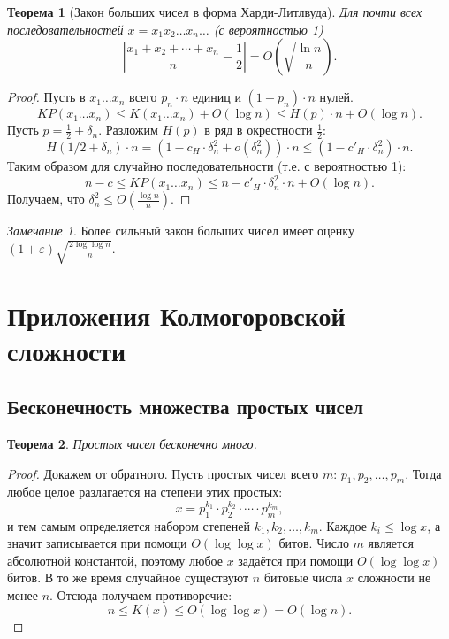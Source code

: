 \documentclass[12pt]{article}
\newcommand{\seqn}[2]{{#1}_1,{#1}_2,\dotsc,{#1}_{#2}}
\theoremstyle{definition}
\theoremstyle{plain}
\newtheorem{theorem}{Теорема}[section]
\theoremstyle{remark}
\newtheorem{remark}{Замечание}[section]
\begin{document}
\begin{theorem}[Закон больших чисел в форма Харди-Литлвуда]
    Для почти всех последовательностей $\bar x = x_1x_2\dotso x_n\dotso$ (с
    вероятностью 1)
    \[
        \left|\frac{x_1+x_2+\dotsb+x_n}{n} - \frac12\right| = 
        O\left(\sqrt{\frac{\ln n}{n}}\right).
    \]
\end{theorem}
\begin{proof}
    Пусть в $x_1\dotso x_n$ всего $p_n\cdot n$ единиц и $(1-p_n)\cdot n$ нулей. 
    \[
        KP(x_1\dotso x_n)\le K(x_1\dotso x_n) + O(\log n) \le 
        H(p)\cdot n + O(\log n).
    \]
    Пусть $p=\frac12 + \delta_n$. Разложим $H(p)$ в ряд в окрестности $\frac12$:
    \[
        H(1/2 + \delta_n)\cdot n = (1 - c_H\cdot\delta_n^2 + o(\delta_n^2))\cdot n
        \le(1 - c'_H\cdot\delta_n^2)\cdot n.
    \]
    Таким образом для случайно последовательности (т.е. с вероятностью 1):
    \[
        n - c \le KP(x_1\dotso x_n)\le n - c'_H\cdot\delta_n^2\cdot n + O(\log n).
    \]
    Получаем, что $\delta_n^2\le O\left(\frac{\log n}{n}\right)$.
\end{proof}
\begin{remark}
    Более сильный закон больших чисел имеет оценку
    $(1+\varepsilon)\sqrt{\frac{2\log\log n}{n}}$.
\end{remark}

\section{Приложения Колмогоровской сложности}

\subsection{Бесконечность множества простых чисел}
\begin{theorem}
    Простых чисел бесконечно много.
\end{theorem}
\begin{proof}
    Докажем от обратного. Пусть простых чисел всего $m$: $\seqn{p}{m}$. 
    Тогда любое целое разлагается на степени этих простых:
    \[
        x = p_1^{k_1}\cdot p_2^{k_2}\cdot\dotsm\cdot p_m^{k_m},
    \]
    и тем самым определяется набором степеней $\seqn{k}{m}$. Каждое $k_i\le\log x$,
    а значит записывается при помощи $O(\log \log x)$ битов. Число $m$ является 
    абсолютной константой, поэтому любое $x$ задаётся при помощи $O(\log\log x)$ битов.
    В то же время случайное существуют $n$ битовые числа $x$ сложности не менее $n$. 
    Отсюда получаем противоречие: 
    \[ n \le K(x) \le O(\log\log x) = O(\log n).\]
\end{proof}
\end{document}
